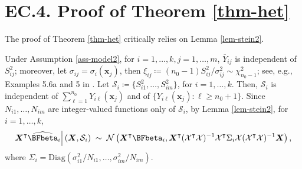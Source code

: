 \documentclass[ijoc,nonblindrev]{informs3}
\def\bx{{\bm x}}
\def\bX{{\bm X}}
\def\cX{{\mathcal X}}
\begin{document}
\hypertarget{EC.4}{
\section*{EC.4. \hspace{5pt} Proof of Theorem \ref{thm-het}}
}

The proof of Theorem \ref{thm-het} critically relies on Lemma \ref{lem-stein2}.


Under Assumption \ref{ass-model2}, for $i=1,\ldots,k,j=1,\ldots,m$, $\overline{Y}_{ij}$ is independent of $ S_{ij}^2$;
moreover, let $\sigma_{ij}= \sigma_i(\bx_j)$, then $\xi_{ij}\coloneqq (n_0-1)S_{ij}^2/\sigma_{ij}^2 \sim \chi_{n_0-1}^2$; see, e.g., Examples 5.6a and 5 in \citet{RencherSchaalje08_ec}.
Let $\mathcal{S}_i \coloneqq  \{S_{i1}^2, \ldots, S_{im}^2 \}$, for $i=1,\ldots,k$.
Then, $\mathcal{S}_i$ is independent of $\sum_{\ell=1}^{n_0} Y_{i\ell}(\bx_j)$ and  of $\{Y_{i\ell}(\bx_j):\ell \geq n_0+1\}$.
Since $N_{i1}, \ldots, N_{im}$  are integer-valued functions only of $\mathcal{S}_i$, by Lemma \ref{lem-stein2}, for $i=1,\ldots,k$,
\[\bX^\intercal \widehat{\BFbeta}_i \Big| \left( \bX, \mathcal{S}_i \right) \;\sim\;  \mathcal N\left(\bX^\intercal \BFbeta_i, \bX^\intercal (\cX^\intercal \cX)^{-1} \cX^\intercal \Sigma_i \cX (\cX^\intercal \cX)^{-1} \bX \right),\]
where $ \Sigma_i = \mathrm{Diag}(\sigma_{i1}^2/N_{i1},\ldots, \sigma_{im}^2/N_{im})$.
\end{document}
